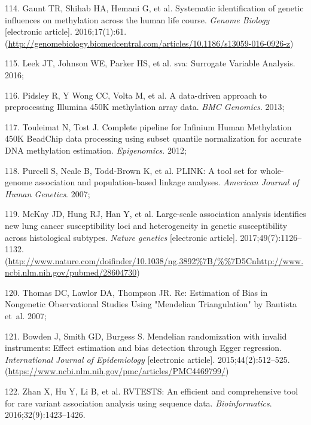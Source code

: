 \documentclass[11pt,twoside]{bristolthesis}
\newenvironment{cslreferences}%
  {}%
  {\par}
\begin{document}
\begin{cslreferences}
\leavevmode\hypertarget{ref-Gaunt2016}{}%
114. Gaunt TR, Shihab HA, Hemani G, et al. Systematic identification of genetic influences on methylation across the human life course. \emph{Genome Biology} {[}electronic article{]}. 2016;17(1):61. (\url{http://genomebiology.biomedcentral.com/articles/10.1186/s13059-016-0926-z})

\leavevmode\hypertarget{ref-Leek2016}{}%
115. Leek JT, Johnson WE, Parker HS, et al. sva: Surrogate Variable Analysis. 2016;

\leavevmode\hypertarget{ref-Pidsley2013}{}%
116. Pidsley R, Y Wong CC, Volta M, et al. A data-driven approach to preprocessing Illumina 450K methylation array data. \emph{BMC Genomics}. 2013;

\leavevmode\hypertarget{ref-Touleimat2012}{}%
117. Touleimat N, Tost J. Complete pipeline for Infinium Human Methylation 450K BeadChip data processing using subset quantile normalization for accurate DNA methylation estimation. \emph{Epigenomics}. 2012;

\leavevmode\hypertarget{ref-Purcell2007}{}%
118. Purcell S, Neale B, Todd-Brown K, et al. PLINK: A tool set for whole-genome association and population-based linkage analyses. \emph{American Journal of Human Genetics}. 2007;

\leavevmode\hypertarget{ref-McKay2017}{}%
119. McKay JD, Hung RJ, Han Y, et al. Large-scale association analysis identifies new lung cancer susceptibility loci and heterogeneity in genetic susceptibility across histological subtypes. \emph{Nature genetics} {[}electronic article{]}. 2017;49(7):1126--1132. (\url{http://www.nature.com/doifinder/10.1038/ng.3892\%7B/\%\%7D5Cnhttp://www.ncbi.nlm.nih.gov/pubmed/28604730})

\leavevmode\hypertarget{ref-Thomas2007}{}%
120. Thomas DC, Lawlor DA, Thompson JR. Re: Estimation of Bias in Nongenetic Observational Studies Using "Mendelian Triangulation" by Bautista et~al. 2007;

\leavevmode\hypertarget{ref-Bowden2015}{}%
121. Bowden J, Smith GD, Burgess S. Mendelian randomization with invalid instruments: Effect estimation and bias detection through Egger regression. \emph{International Journal of Epidemiology} {[}electronic article{]}. 2015;44(2):512--525. (\url{https://www.ncbi.nlm.nih.gov/pmc/articles/PMC4469799/})

\leavevmode\hypertarget{ref-Zhan2016}{}%
122. Zhan X, Hu Y, Li B, et al. RVTESTS: An efficient and comprehensive tool for rare variant association analysis using sequence data. \emph{Bioinformatics}. 2016;32(9):1423--1426.


\end{cslreferences}
\end{document}
